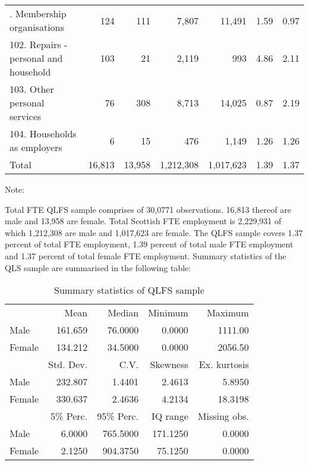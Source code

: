 {\begin{center}
\begin{longtable}{lrrrrrr}
     \hdashline[1pt/1pt]
    101. Membership organisations & 124   & 111   & 7,807 & 11,491 & 1.59  & 0.97 \bigstrut[t]\\
    102. Repairs - personal and household & 103   & 21    & 2,119 & 993   & 4.86  & 2.11 \\
    103. Other personal services & 76    & 308   & 8,713 & 14,025 & 0.87  & 2.19 \\
    104. Households as employers & 6     & 15    & 476   & 1,149 & 1.26  & 1.26 \\
    \hline
    \multicolumn{1}{l}{Total} & 16,813 & 13,958 & 1,212,308 & 1,017,623 & 1.39 & 1.37  \\
    \end{longtable}
\end{center} 
} %

Note: 

\bigskip

Total FTE QLFS sample comprises of 30,0771 observations. 16,813 thereof are male and 13,958 are female. Total Scottish FTE employment is 2,229,931 of which 1,212,308 are male and 1,017,623 are female. The QLFS sample covers 1.37 percent of total FTE employment, 1.39 percent of total male FTE employment and 1.37 percent of total female FTE employment. Summary statistics of the QLS sample are summarised in the following table:

\bigskip

\begin{table}[H] \caption*{Summary statistics of QLFS sample}
\bigskip \begin{scriptsize} \begin{centering} \begin{doublespacing}
    \begin{tabular}{lrrrr}
   \toprule
          & Mean  & Median & Minimum & Maximum \\
    Male  & 161.659 & 76.0000 & 0.0000 & 1111.00 \\
    Female & 134.212 & 34.5000 & 0.0000 & 2056.50 \\
          & Std. Dev. & C.V.  & Skewness & Ex. kurtosis \\
    Male  & 232.807 & 1.4401 & 2.4613 & 5.8950 \\
    Female & 330.637 & 2.4636 & 4.2134 & 18.3198 \\
          & 5\% Perc. & 95\% Perc. & IQ range & Missing obs. \\
    Male  & 6.0000 & 765.5000 & 171.1250 & 0.0000 \\
    Female & 2.1250 & 904.3750 & 75.1250 & 0.0000 \\
\bottomrule \end{tabular}%
\begin{flushright}  \end{flushright} 
\end{doublespacing} \end{centering} \end{scriptsize} \end{table} \bigskip


